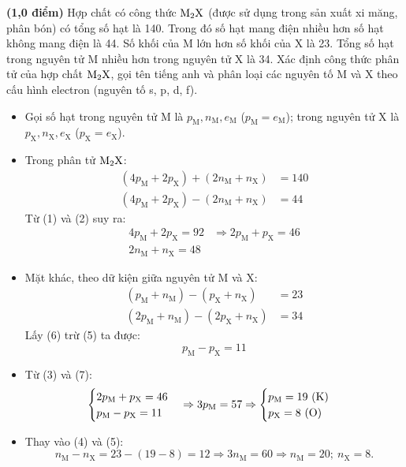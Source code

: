 \documentclass[11pt,a4paper]{article}
\begin{document}
\begin{ex}%
\textbf{(1,0 điểm)} Hợp chất có công thức $\ce{M2X}$ (được sử dụng trong sản xuất xi măng, phân bón) có tổng số hạt là 140. Trong đó số hạt mang điện nhiều hơn số hạt không mang điện là 44. Số khối của M lớn hơn số khối của X là 23. Tổng số hạt trong nguyên tử M nhiều hơn trong nguyên tử X là 34. Xác định công thức phân tử của hợp chất $\ce{M2X}$, gọi tên tiếng anh và phân loại các nguyên tố M và X theo cấu hình electron (nguyên tố s, p, d, f).
\begin{loigiai}
\begin{itemize}[leftmargin=0.8cm]
\item Gọi số hạt trong nguyên tử M là $p_\text{M}, n_\text{M}, e_\text{M}$ ($p_\text{M} = e_\text{M}$); trong nguyên tử X là $p_\text{X}, n_\text{X}, e_\text{X}$ ($p_\text{X} = e_\text{X}$).
\item Trong phân tử $\ce{M2X}$:
\begin{align}
(4p_\text{M} + 2p_\text{X}) + (2n_\text{M} + n_\text{X}) &= 140 \tag{1}\\
(4p_\text{M} + 2p_\text{X}) - (2n_\text{M} + n_\text{X}) &= 44 \tag{2}
\end{align}
Từ (1) và (2) suy ra:
\begin{align*}
4p_\text{M} + 2p_\text{X} = 92 &\Rightarrow 2p_\text{M} + p_\text{X} = 46 \tag{3}\\
2n_\text{M} + n_\text{X} = 48 &\tag{4}
\end{align*}
\item Mặt khác, theo dữ kiện giữa nguyên tử M và X:
\begin{align}
(p_\text{M} + n_\text{M}) - (p_\text{X} + n_\text{X}) &= 23 \tag{5}\\
(2p_\text{M} + n_\text{M}) - (2p_\text{X} + n_\text{X}) &= 34 \tag{6}
\end{align}
Lấy (6) trừ (5) ta được:
$$p_\text{M} - p_\text{X} = 11 \tag{7}$$
\item Từ (3) và (7):
$$\begin{cases} 2p_\text{M} + p_\text{X} = 46 \\ p_\text{M} - p_\text{X} = 11 \end{cases} \Rightarrow 3p_\text{M} = 57 \Rightarrow \begin{cases} p_\text{M} = 19\ (\ce{K}) \\ p_\text{X} = 8\ (\ce{O}) \end{cases}$$
\item Thay vào (4) và (5):
$$n_\text{M} - n_\text{X} = 23 - (19 - 8) = 12 \Rightarrow 3n_\text{M} = 60 \Rightarrow n_\text{M} = 20;\ n_\text{X} = 8.$$

\end{itemize}
\end{loigiai}
\end{ex}
\end{document}
